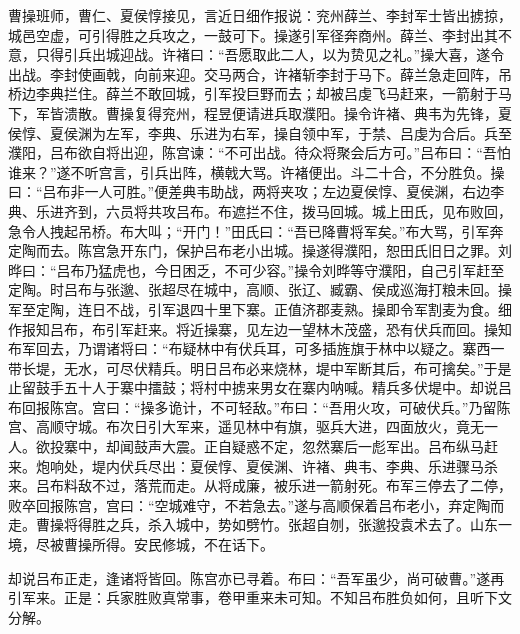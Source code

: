 曹操班师，曹仁、夏侯惇接见，言近日细作报说：兖州薛兰、李封军士皆出掳掠，城邑空虚，可引得胜之兵攻之，一鼓可下。操遂引军径奔商州。薛兰、李封出其不意，只得引兵出城迎战。许褚曰：“吾愿取此二人，以为贽见之礼。”操大喜，遂令出战。李封使画戟，向前来迎。交马两合，许褚斩李封于马下。薛兰急走回阵，吊桥边李典拦住。薛兰不敢回城，引军投巨野而去；却被吕虔飞马赶来，一箭射于马下，军皆溃散。曹操复得兖州，程昱便请进兵取濮阳。操令许褚、典韦为先锋，夏侯惇、夏侯渊为左军，李典、乐进为右军，操自领中军，于禁、吕虔为合后。兵至濮阳，吕布欲自将出迎，陈宫谏：“不可出战。待众将聚会后方可。”吕布曰：“吾怕谁来？”遂不听宫言，引兵出阵，横戟大骂。许褚便出。斗二十合，不分胜负。操曰：“吕布非一人可胜。”便差典韦助战，两将夹攻；左边夏侯惇、夏侯渊，右边李典、乐进齐到，六员将共攻吕布。布遮拦不住，拨马回城。城上田氏，见布败回，急令人拽起吊桥。布大叫；“开门！”田氏曰：“吾已降曹将军矣。”布大骂，引军奔定陶而去。陈宫急开东门，保护吕布老小出城。操遂得濮阳，恕田氏旧日之罪。刘晔曰：“吕布乃猛虎也，今日困乏，不可少容。”操令刘晔等守濮阳，自己引军赶至定陶。时吕布与张邈、张超尽在城中，高顺、张辽、臧霸、侯成巡海打粮未回。操军至定陶，连日不战，引军退四十里下寨。正值济郡麦熟。操即令军割麦为食。细作报知吕布，布引军赶来。将近操寨，见左边一望林木茂盛，恐有伏兵而回。操知布军回去，乃谓诸将曰：“布疑林中有伏兵耳，可多插旌旗于林中以疑之。寨西一带长堤，无水，可尽伏精兵。明日吕布必来烧林，堤中军断其后，布可擒矣。”于是止留鼓手五十人于寨中擂鼓；将村中掳来男女在寨内呐喊。精兵多伏堤中。却说吕布回报陈宫。宫曰：“操多诡计，不可轻敌。”布曰：“吾用火攻，可破伏兵。”乃留陈宫、高顺守城。布次日引大军来，遥见林中有旗，驱兵大进，四面放火，竟无一人。欲投寨中，却闻鼓声大震。正自疑惑不定，忽然寨后一彪军出。吕布纵马赶来。炮响处，堤内伏兵尽出：夏侯惇、夏侯渊、许褚、典韦、李典、乐进骤马杀来。吕布料敌不过，落荒而走。从将成廉，被乐进一箭射死。布军三停去了二停，败卒回报陈宫，宫曰：“空城难守，不若急去。”遂与高顺保着吕布老小，弃定陶而走。曹操将得胜之兵，杀入城中，势如劈竹。张超自刎，张邈投袁术去了。山东一境，尽被曹操所得。安民修城，不在话下。

却说吕布正走，逢诸将皆回。陈宫亦已寻着。布曰：“吾军虽少，尚可破曹。”遂再引军来。正是：兵家胜败真常事，卷甲重来未可知。不知吕布胜负如何，且听下文分解。